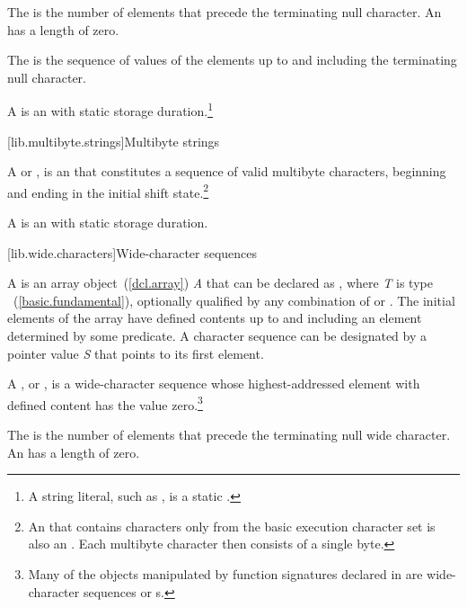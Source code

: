 \pnum
The
is the number of elements that
precede the terminating null character.
%
An
has a length of zero.

\pnum
The
is the sequence of values of the
elements up to and including the terminating null character.
%

\pnum
A
%
%
is an \ntbs with
static storage duration.\footnote{A string literal, such as ,
is a static \ntbs.}

[lib.multibyte.strings]{Multibyte strings}

\pnum
A
%
%
or \term{\ntmbs},
%
is an \ntbs that constitutes a
sequence of valid multibyte characters, beginning and ending in the initial
shift state.\footnote{An \ntbs that contains characters only from the
basic execution character set is also an \ntmbs.
Each multibyte character then
consists of a single byte.}

\pnum
A
is an \ntmbs with static storage duration.
%
%

[lib.wide.characters]{Wide-character sequences}

\pnum
A
is an array object~(\ref{dcl.array}) \textit{A} that
can be declared as
,
where \textit{T} is type
~(\ref{basic.fundamental}),
optionally qualified by any combination of
or
.
The initial elements of the
array have defined contents up to and including an element determined by some
predicate.
A character sequence can be designated by a pointer value
\textit{S} that points to its first element.

\pnum
A
%
%
,
or \term{\ntwcs},
is a wide-character sequence whose highest-addressed element
with defined content has the value zero.\footnote{Many of the objects manipulated by
function signatures declared in
 are wide-character sequences or \ntwcs{}s.
%
%
}

\pnum
The
is the number of elements that
precede the terminating null wide character.
%
An
has a length of zero.

